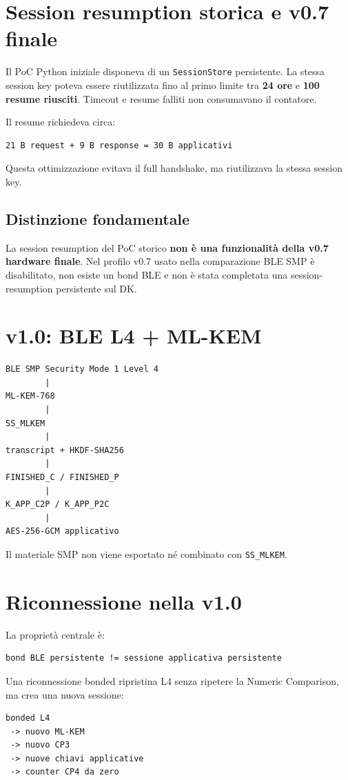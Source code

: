 \documentclass[11pt,a4paper]{article}
\begin{document}
\section{Session resumption storica e v0.7 finale}
Il PoC Python iniziale disponeva di un \texttt{SessionStore} persistente.
La stessa session key poteva essere riutilizzata fino al primo limite tra
\textbf{24 ore} e \textbf{100 resume riusciti}. Timeout e resume falliti non
consumavano il contatore.

Il resume richiedeva circa:
\begin{verbatim}
21 B request + 9 B response = 30 B applicativi
\end{verbatim}

Questa ottimizzazione evitava il full handshake, ma riutilizzava la stessa session key.

\subsection{Distinzione fondamentale}
La session resumption del PoC storico \textbf{non è una funzionalità della v0.7
hardware finale}. Nel profilo v0.7 usato nella comparazione BLE SMP è
disabilitato, non esiste un bond BLE e non è stata completata una
session-resumption persistente sul DK.

\section{v1.0: BLE L4 + ML-KEM}
\begin{verbatim}
BLE SMP Security Mode 1 Level 4
        |
ML-KEM-768
        |
SS_MLKEM
        |
transcript + HKDF-SHA256
        |
FINISHED_C / FINISHED_P
        |
K_APP_C2P / K_APP_P2C
        |
AES-256-GCM applicativo
\end{verbatim}

Il materiale SMP non viene esportato né combinato con \texttt{SS\_MLKEM}.

\section{Riconnessione nella v1.0}
La proprietà centrale è:
\begin{verbatim}
bond BLE persistente != sessione applicativa persistente
\end{verbatim}

Una riconnessione bonded ripristina L4 senza ripetere la Numeric Comparison, ma crea una nuova sessione:
\begin{verbatim}
bonded L4
 -> nuovo ML-KEM
 -> nuovo CP3
 -> nuove chiavi applicative
 -> counter CP4 da zero
\end{verbatim}
\end{document}
